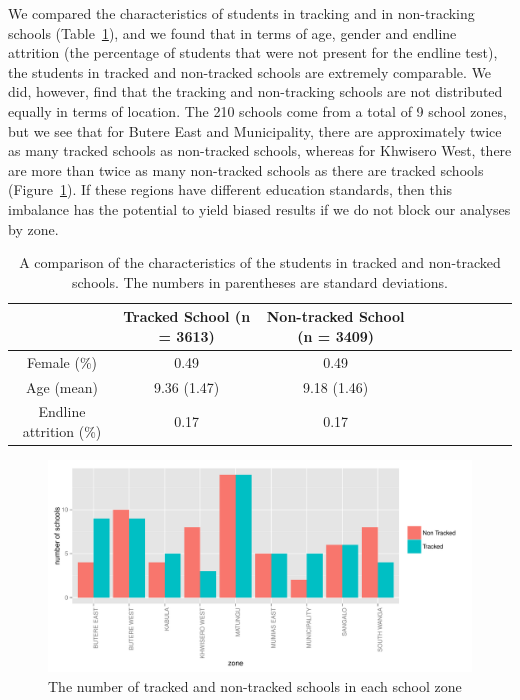 \documentclass[11pt]{article}
\begin{document}
 We compared the characteristics of students in tracking and in non-tracking schools (Table~\ref{tab:char}), and we found that in terms of age, gender and endline attrition (the percentage of students that were not present for the endline test), the students in tracked and non-tracked schools are extremely comparable. We did, however, find that the tracking and non-tracking schools are not distributed equally in terms of location. The 210 schools come from a total of 9 school zones, but we see that for Butere East and Municipality, there are approximately twice as many tracked schools as non-tracked schools, whereas for Khwisero West, there are more than twice as many non-tracked schools as there are tracked schools (Figure~\ref{fig:zone}). If these regions have different education standards, then this imbalance has the potential to yield biased results if we do not block our analyses by zone. 
 
 
 \begin{table}[H]
 \centering
 \begin{tabular}{cccccccccc}
 \hline
 & Tracked School (n = 3613) & Non-tracked School (n = 3409)\\
 \hline
Female (\%) & 0.49 & 0.49\\
Age (mean) & 9.36 (1.47) & 9.18 (1.46)\\
Endline attrition (\%) & 0.17 & 0.17\\ \hline
 \end{tabular}
 \caption{A comparison of the characteristics of the students in tracked and non-tracked schools. The numbers in parentheses are standard deviations.}
 \label{tab:char}
 \end{table} 
 
 \begin{figure}[H]
 \centering
 \includegraphics[scale = 0.6]{school_zones.pdf}
 \caption{The number of tracked and non-tracked schools in each school zone}
 \label{fig:zone}
 \end{figure}
 
\end{document}
